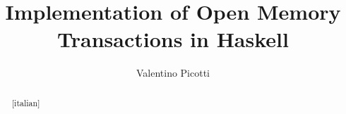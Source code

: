 \documentclass{thesis}
\title{Implementation of Open Memory Transactions in Haskell}
\author{Valentino Picotti}
\begin{document}
\maketitle

\begin{dedication}

\end{dedication}

\begin{abstract}[italian]

\end{abstract}

\begin{abstract}

\end{abstract}

\begin{acknowledgements}[italian]

\end{acknowledgements}

\tableofcontents

\mainmatter






\backmatter

\end{document}
